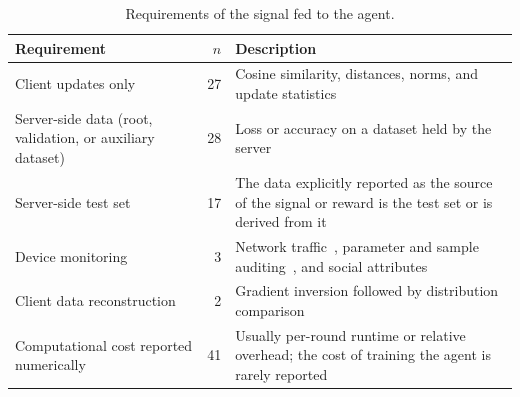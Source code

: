 \begin{table}[!ht]
  \centering
  \caption{Requirements of the signal fed to the agent.}
  \label{tab:sinal}
  \footnotesize
  \setlength{\tabcolsep}{3pt}
  \renewcommand{\arraystretch}{1.12}
  \begin{tabularx}{\columnwidth}{@{}
    >{\raggedright\arraybackslash}p{3.99cm}
    r
    >{\raggedright\arraybackslash}X
    @{}}
    \toprule
    Requirement & $n$ & Description \\
    \midrule
    Client updates only
      & 27
      & Cosine similarity, distances, norms, and update statistics \\
    Server-side data (root, validation, or auxiliary dataset)
      & 28
      & Loss or accuracy on a dataset held by the server \\
    Server-side test set
      & 17
      & The data explicitly reported as the source of the signal or reward is the test set or is derived from it \\
    Device monitoring
      & 3
      & Network traffic~\cite{V2-0391}, parameter and sample auditing~\cite{V2-1130}, and social attributes~\cite{V2-0634} \\
    Client data reconstruction
      & 2
      & Gradient inversion followed by distribution comparison~\cite{V2-1231,V2-4812} \\
    \midrule
    Computational cost reported numerically
      & 41
      & Usually per-round runtime or relative overhead; the cost of training the agent is rarely reported \\
    \bottomrule
  \end{tabularx}
\end{table}
